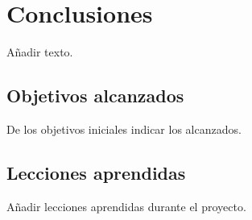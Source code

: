 
\pagestyle{fancy}

\chapter{Conclusiones}
\label{conclusiones}

Añadir texto.

\section{Objetivos alcanzados}

De los objetivos iniciales indicar los alcanzados.\\

\section{Lecciones aprendidas}

Añadir lecciones aprendidas durante el proyecto.\\